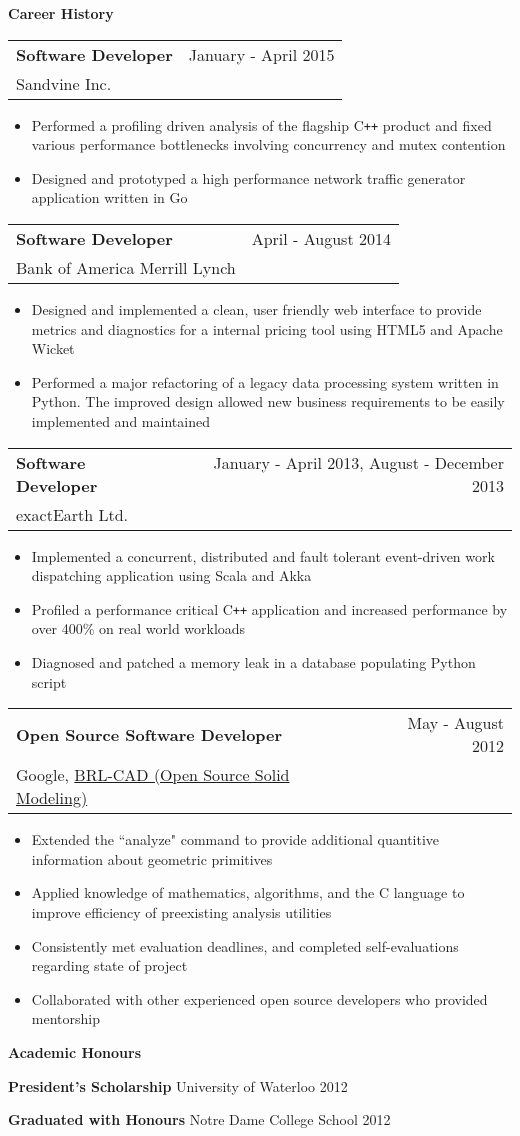 \documentclass[10pt]{article}
\makeatletter
\newcommand{\resheading}[1]{{\large \colorbox{headercol}{\begin{minipage}{\textwidth}{\textbf{#1 \vphantom{p\^{E}}}}\end{minipage}}}}
\newcommand{\ressubheading}[3]{\item
\begin{tabular*}{7in}{l@{\extracolsep{\fill}}r}
    \textbf{#1} & #2 \\ #3
\end{tabular*}\vspace{-4pt}}
\newcommand{\resitem}[2]{\item{\textbf{#1} #2}}
\makeatother
\begin{document}
\resheading{Career History}
\begin{description}
    \ressubheading{Software Developer} {January - April 2015} {Sandvine Inc.}
    \begin{itemize}
         \item{Performed a profiling driven analysis of the flagship C\texttt{++} product and fixed various performance bottlenecks involving concurrency and mutex contention}
         \item{Designed and prototyped a high performance network traffic generator application written in Go}
    \end{itemize}
    \ressubheading{Software Developer} {April - August 2014} {Bank of America Merrill Lynch}
    \begin{itemize}
        \item{Designed and implemented a clean, user friendly web interface to provide metrics and diagnostics for a internal pricing tool using HTML5 and Apache Wicket}
        \item{Performed a major refactoring of a legacy data processing system written in Python. The improved design allowed new business requirements to be easily implemented and maintained}
    \end{itemize}
    \ressubheading{Software Developer} {January - April 2013, August - December 2013} {exactEarth Ltd.}
    \begin{itemize}
        \item{Implemented a concurrent, distributed and fault tolerant event-driven work dispatching application using Scala and Akka}
        \item{Profiled a performance critical C\texttt{++} application and increased performance by over 400\% on real world workloads}
        \item{Diagnosed and patched a memory leak in a database populating Python script}
    \end{itemize}
    \ressubheading{Open Source Software Developer} {May - August 2012} {Google, \href{http://brlcad.org}{BRL-CAD (Open Source Solid Modeling)}}
    \begin{itemize}
        \item{Extended the ``analyze" command to provide additional quantitive information about geometric primitives}
        \item{Applied knowledge of mathematics, algorithms, and the C language to improve efficiency of preexisting analysis utilities}
        \item{Consistently met evaluation deadlines, and completed self-evaluations regarding state of project}
        \item{Collaborated with other experienced open source developers who provided mentorship}
    \end{itemize}
\end{description}

\resheading{Academic Honours}
\begin{description}
    \resitem{President's Scholarship} {University of Waterloo \hfill 2012}
    \resitem{Graduated with Honours} {Notre Dame College School \hfill 2012}
\end{description}
\end{document}
